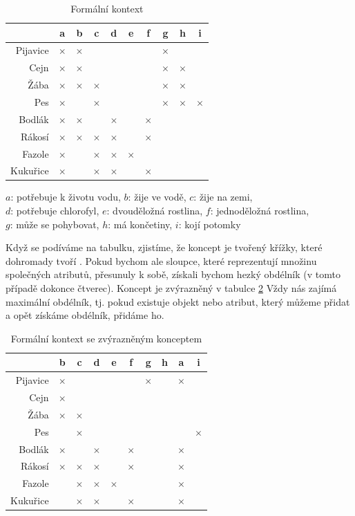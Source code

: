 \documentclass[12pt]{article}
\newcommand{\yes}{$\times$}
\newcommand{\fyes}{\fbox{$\times$}}
\begin{document}
\begin{table}
\begin{center}
\begin{tabular}{r|ccccccccc}
\toprule
&a&b&c&d&e&f&g&h&i\\
\midrule
Pijavice&\yes&\yes&&&&&\yes\\
Cejn&\yes&\yes&&&&&\yes&\yes\\
Žába&\yes&\yes&\yes&&&&\yes&\yes\\
Pes&\yes&&\yes&&&&\yes&\yes&\yes\\
Bodlák&\yes&\yes&&\yes&&\yes\\
Rákosí&\yes&\yes&\yes&\yes&&\yes\\
Fazole&\yes&&\yes&\yes&\yes\\
Kukuřice&\yes&&\yes&\yes&&\yes\\
\bottomrule
\end{tabular}
\end{center}
\caption{Formální kontext} \label{tab.con1}

\begin{center}
$a$: potřebuje k životu vodu, $b$: žije ve vodě, $c$: žije na zemi,\\ $d$: potřebuje chlorofyl, $e$: dvouděložná rostlina, $f$: jednoděložná rostlina,\\ $g$: může se pohybovat, $h$: má končetiny, $i$: kojí potomky
\end{center}
\end{table}

Když se podíváme na tabulku, zjistíme, že koncept je tvořený křížky, které dohromady tvoří . Pokud bychom ale sloupce, které reprezentují množinu společných atributů, přesunuly k sobě, získali bychom hezký obdélník (v tomto případě dokonce čtverec). Koncept je zvýrazněný v tabulce \ref{tab.con2} Vždy nás zajímá maximální obdélník, tj. pokud existuje objekt nebo atribut, který můžeme přidat a opět získáme obdélník, přidáme ho. 

\begin{table}
\begin{center}
\begin{tabular}{r|ccccccccc}
\toprule
&b&c&d&e&f&g&h&a&i\\
\midrule
Pijavice&\yes&&&&&\yes&&\yes\\
Cejn&\yes&&&&&\fyes&\fyes&\fyes\\
Žába&\yes&\yes&&&&\fyes&\fyes&\fyes\\
Pes&&\yes&&&&\fyes&\fyes&\fyes&\yes\\
Bodlák&\yes&&\yes&&\yes&&&\yes\\
Rákosí&\yes&\yes&\yes&&\yes&&&\yes\\
Fazole&&\yes&\yes&\yes&&&&\yes\\
Kukuřice&&\yes&\yes&&\yes&&&\yes\\
\bottomrule
\end{tabular}
\end{center}
\caption{Formální kontext se zvýrazněným konceptem} \label{tab.con2}
\end{table}
\end{document}
